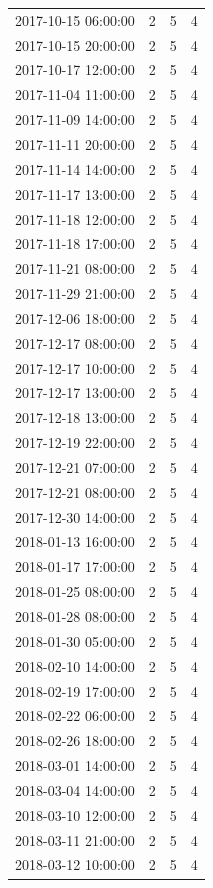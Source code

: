 \begin{tabular}{lrrr}
2017-10-15 06:00:00 & 2 & 5 & 4 \\
2017-10-15 20:00:00 & 2 & 5 & 4 \\
2017-10-17 12:00:00 & 2 & 5 & 4 \\
2017-11-04 11:00:00 & 2 & 5 & 4 \\
2017-11-09 14:00:00 & 2 & 5 & 4 \\
2017-11-11 20:00:00 & 2 & 5 & 4 \\
2017-11-14 14:00:00 & 2 & 5 & 4 \\
2017-11-17 13:00:00 & 2 & 5 & 4 \\
2017-11-18 12:00:00 & 2 & 5 & 4 \\
2017-11-18 17:00:00 & 2 & 5 & 4 \\
2017-11-21 08:00:00 & 2 & 5 & 4 \\
2017-11-29 21:00:00 & 2 & 5 & 4 \\
2017-12-06 18:00:00 & 2 & 5 & 4 \\
2017-12-17 08:00:00 & 2 & 5 & 4 \\
2017-12-17 10:00:00 & 2 & 5 & 4 \\
2017-12-17 13:00:00 & 2 & 5 & 4 \\
2017-12-18 13:00:00 & 2 & 5 & 4 \\
2017-12-19 22:00:00 & 2 & 5 & 4 \\
2017-12-21 07:00:00 & 2 & 5 & 4 \\
2017-12-21 08:00:00 & 2 & 5 & 4 \\
2017-12-30 14:00:00 & 2 & 5 & 4 \\
2018-01-13 16:00:00 & 2 & 5 & 4 \\
2018-01-17 17:00:00 & 2 & 5 & 4 \\
2018-01-25 08:00:00 & 2 & 5 & 4 \\
2018-01-28 08:00:00 & 2 & 5 & 4 \\
2018-01-30 05:00:00 & 2 & 5 & 4 \\
2018-02-10 14:00:00 & 2 & 5 & 4 \\
2018-02-19 17:00:00 & 2 & 5 & 4 \\
2018-02-22 06:00:00 & 2 & 5 & 4 \\
2018-02-26 18:00:00 & 2 & 5 & 4 \\
2018-03-01 14:00:00 & 2 & 5 & 4 \\
2018-03-04 14:00:00 & 2 & 5 & 4 \\
2018-03-10 12:00:00 & 2 & 5 & 4 \\
2018-03-11 21:00:00 & 2 & 5 & 4 \\
2018-03-12 10:00:00 & 2 & 5 & 4 \\

\end{tabular}
